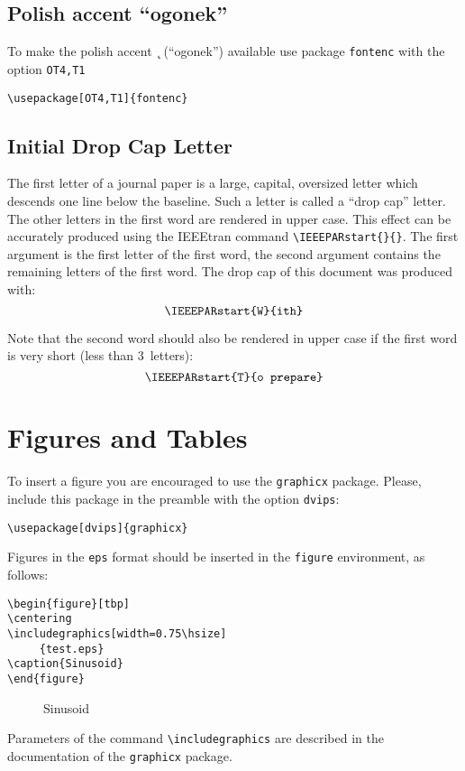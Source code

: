 \documentclass[conference]{IEEEtran}
\begin{document}
\subsection{Polish accent ``ogonek''}
To make the polish accent {\k \ } (``ogonek'') available use package \verb|fontenc| with the option \verb|OT4,T1|
\begin{verbatim}
\usepackage[OT4,T1]{fontenc}
\end{verbatim}

\subsection{Initial Drop Cap Letter}
 The first letter of a journal paper is a large, capital, oversized
letter which descends one line below the baseline. Such a
letter is called a ``drop cap'' letter. The other letters in the first
word are rendered in upper case. This effect can be accurately
produced using the IEEEtran command \verb|\IEEEPARstart{}{}|. The first argument is the first letter of the first word, the
second argument contains the remaining letters of the first
word. The drop cap of this document was produced with:
$$\verb|\IEEEPARstart{W}{ith}|$$

Note that the second word should also be rendered  in
upper case if the first word is very short (less than 3~letters):
$$\verb|\IEEEPARstart{T}{o prepare}|$$


\section{Figures and Tables}
To insert a figure you are encouraged to use the  \verb|graphicx| package. Please, include this package in the preamble with the option \verb|dvips|:
\begin{verbatim}
\usepackage[dvips]{graphicx}
\end{verbatim}
Figures in the \verb|eps| format should be inserted in the \verb|figure| environment, as follows:
\begin{verbatim}
\begin{figure}[tbp]
\centering
\includegraphics[width=0.75\hsize]
     {test.eps}
\caption{Sinusoid}
\end{figure}
\end{verbatim}
%
\begin{figure}[tbp]
\centering
\caption{Sinusoid}
\end{figure}
%
Parameters of the command \verb|\includegraphics| are described in the documentation of the \verb|graphicx| package.
\end{document}
